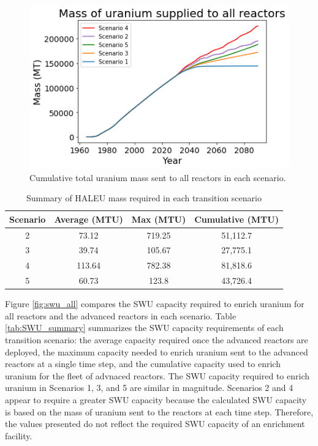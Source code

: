 \begin{figure}
    \centering 
    \includegraphics[scale=0.4]{../figures/fuelsupplytotal_scenarios_all.png}
    \caption{Cumulative total uranium mass sent to all reactors in each scenario.}
    \label{fig:cumulativeU_all}
\end{figure}


\begin{table}
    \centering
    \caption{Summary of \gls{HALEU} mass required in each transition scenario}
    \label{tab:U_summary}
    \begin{tabular}{c c c c}
        \hline
        Scenario & Average (MTU) & Max (MTU) & Cumulative (MTU) \\\hline
        2 & 73.12 & 719.25 & 51,112.7 \\
        3 & 39.74 & 105.67 & 27,775.1 \\
        4 & 113.64 & 782.38 & 81,818.6 \\
        5 & 60.73 & 123.8 & 43,726.4 
        \\\hline       
    \end{tabular}
\end{table}

Figure \ref{fig:swu_all} compares the \gls{SWU} capacity required to enrich uranium for 
all reactors and the advanced reactors in each scenario. Table \ref{tab:SWU_summary} 
summarizes the \gls{SWU} capacity 
requirements of each transition scenario: the average capacity required once the 
advanced reactors are deployed, the maximum capacity needed to enrich uranium sent to 
the advanced reactors at a single time step, and the cumulative capacity used to enrich 
uranium for the fleet of advnaced reactors. The \gls{SWU} capacity required 
to enrich uranium in Scenarios 1, 3, and 5 are similar in magnitude. Scenarios 2 and 4
appear to require a greater \gls{SWU} capacity because the calculated \gls{SWU} capacity 
is based on the mass of uranium sent to the reactors at each time step. Therefore, 
the values presented do not reflect the required \gls{SWU} capacity of 
an enrichment facility. 

